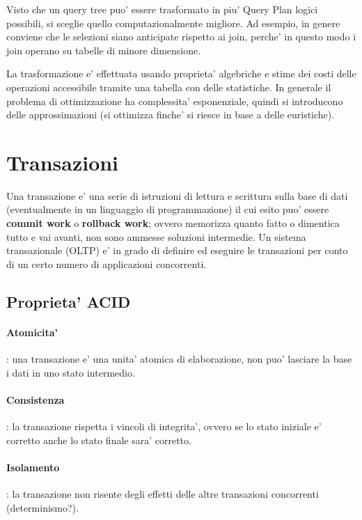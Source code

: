 Visto che un query tree puo' essere trasformato in piu' Query Plan logici possibili, si sceglie quello computazionalmente migliore.
Ad esempio, in genere conviene che le selezioni siano anticipate rispetto ai join, perche' in questo modo i join operano su tabelle di minore dimensione.

La trasformazione e' effettuata usando proprieta' algebriche e stime dei costi delle operazioni accessibile tramite una tabella con delle statistiche.
In generale il problema di ottimizzazione ha complessita' esponenziale, quindi si introducono delle approssimazioni (si ottimizza finche' si riesce in base a delle euristiche).


\section{Transazioni}

Una transazione e' una serie di istruzioni di lettura e scrittura sulla base di dati (eventualmente in un linguaggio di programmazione) il cui esito puo' essere \textbf{commit work} o \textbf{rollback work}; ovvero memorizza quanto fatto o dimentica tutto e vai avanti, non sono ammesse soluzioni intermedie.
Un sistema transazionale (OLTP) e' in grado di definire ed eseguire le transazioni per conto di un certo numero di applicazioni concorrenti.

\subsection{Proprieta' ACID}

\paragraph{Atomicita'}: una transazione e' una unita' atomica di elaborazione, non puo' lasciare la base i dati in uno stato intermedio.

\paragraph{Consistenza}: la transazione rispetta i vincoli di integrita', ovvero se lo stato iniziale e' corretto anche lo stato finale sara' corretto.

\paragraph{Isolamento}: la transazione non risente degli effetti delle altre transazioni concorrenti (determinismo?).

